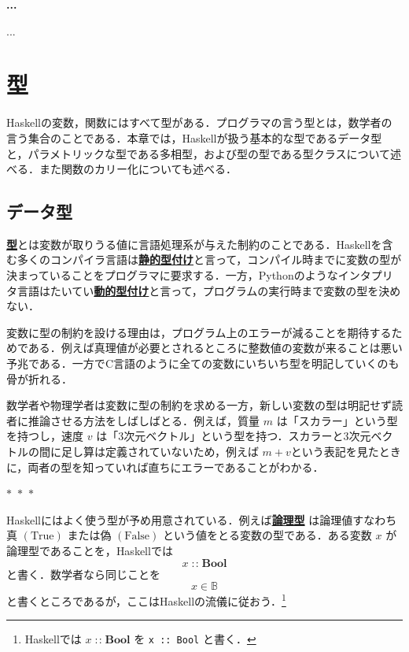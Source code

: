 \documentclass[a4paper,twocolumn]{jsbook}
\newcommand{\separator}{\begin{center}$*$~$*$~$*$\end{center}}
\newcommand{\programminglanguage}[1]{\textsf{#1}}
\newcommand{\clang}{\programminglanguage{C}}
\newcommand{\haskell}{\programminglanguage{Haskell}}
\newcommand{\python}{\programminglanguage{Python}}
\newenvironment{leader}{\begingroup\gt}{\endgroup}
\newenvironment{note}[1]{\begin{boxnote}\begin{center}\textbf{#1}\end{center}}{\end{boxnote}}
\newcommand{\keyword}[1]{{\underline{\textbf{#1}}}}
\newcommand{\code}[1]{\texttt{#1}}
\newcommand{\mSpecialConstant}[1]{\textrm{#1}} %
\newcommand{\mFalse}{\mSpecialConstant{False}}
\newcommand{\mTrue}{\mSpecialConstant{True}}
\DeclareMathOperator{\mIn}{{:\!:}}
\newcommand{\mSpecialSet}[1]{\mathbb{#1}} %
\newcommand{\mBSet}{\mSpecialSet{B}}
\newcommand{\mType}[1]{\mathbf{#1}}
\newcommand{\mBoolType}{\mType{Bool}}
\begin{document}
\begin{note}{...}
...
\end{note}

\chapter{型}
\label{ch:type}

\begin{leader}
\haskell の変数，関数にはすべて型がある．プログラマの言う型とは，数学者の言う集合のことである．本章では，\haskell が扱う基本的な型であるデータ型と，パラメトリックな型である多相型，および型の型である型クラスについて述べる．また関数のカリー化についても述べる．
\end{leader}


\section{データ型}

\keyword{型}とは変数が取りうる値に言語処理系が与えた制約のことである．\haskell を含む多くのコンパイラ言語は\keyword{静的型付け}と言って，コンパイル時までに変数の型が決まっていることをプログラマに要求する．一方，\python のようなインタプリタ言語はたいてい\keyword{動的型付け}と言って，プログラムの実行時まで変数の型を決めない．

変数に型の制約を設ける理由は，プログラム上のエラーが減ることを期待するためである．例えば真理値が必要とされるところに整数値の変数が来ることは悪い予兆である．一方で\clang 言語のように全ての変数にいちいち型を明記していくのも骨が折れる．

数学者や物理学者は変数に型の制約を求める一方，新しい変数の型は明記せず読者に推論させる方法をしばしばとる．例えば，質量 $m$ は「スカラー」という型を持つし，速度 $v$ は「3次元ベクトル」という型を持つ．スカラーと3次元ベクトルの間に足し算は定義されていないため，例えば $m+v$という表記を見たときに，両者の型を知っていれば直ちにエラーであることがわかる．

\separator

\haskell にはよく使う型が予め用意されている．例えば\keyword{論理型} は論理値すなわち真 $(\mTrue)$ または偽 $(\mFalse)$ という値をとる変数の型である．ある変数 $x$ が論理型であることを，\haskell では
\begin{equation}
x\mIn\mBoolType
\end{equation}
と書く．数学者なら同じことを
\begin{equation}
x\in\mBSet
\end{equation}
と書くところであるが，ここは\haskell の流儀に従おう．\footnote{\haskell では $x\mIn\mBoolType$ を \code{x :: Bool} と書く．}
\end{document}
